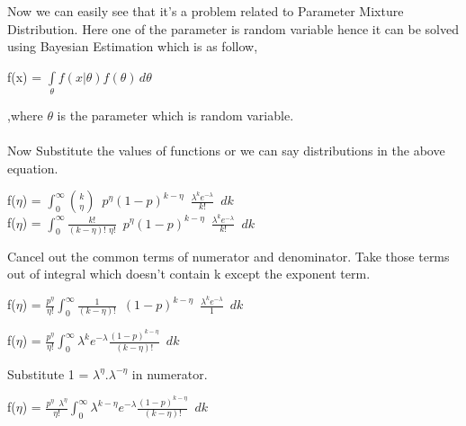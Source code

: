 \documentclass[12pt]{article}
\begin{document}
        Now we can easily see that it's a problem related to Parameter Mixture Distribution. Here one of the parameter is random variable hence it can be solved using Bayesian Estimation which is as follow,
        
        \begin{center}
        \large f(x) = $\int\limits_\theta f(x |\theta)f(\theta)\,d\theta$ \normalsize
        \end{center}
        
        ,where $\theta$ is the parameter which is random variable.\\\\
        Now Substitute the values of functions or we can say distributions in the above equation.
        
        \begin{center}
        \Large
        f($\eta$) = $\int_0^\infty \binom{k}{\eta}\,\,\, p^{\eta} (1-p)^{k-\eta}\,\,\, \frac{\lambda^{k}e^{-\lambda}}{k!}\,\,\, dk $ \\
        
        f($\eta$) = $\int_0^\infty \frac{k!}{(k-\eta)! \,\,\eta!}\,\,\, p^{\eta} (1-p)^{k-\eta}\,\,\, \frac{\lambda^{k}e^{-\lambda}}{k!}\,\,\, dk $ \\
        \end{center}
        
        \normalsize Cancel out the common terms of numerator and denominator. Take those terms out of integral which doesn't contain k except the exponent term.\Large
        
        \begin{center}
        f($\eta$) = $\frac{p^\eta}{\eta!}\int_0^\infty \frac{1}{(k-\eta)!}\,\,\, (1-p)^{k-\eta}\,\,\, \frac{\lambda^{k}e^{-\lambda}}{1}\,\,\, dk $ 
        
        f($\eta$) = $\frac{p^\eta}{\eta!}\int_0^\infty \lambda^{k}e^{-\lambda} \frac{(1-p)^{k-\eta}}{(k-\eta)!} \,\,\, dk $ \\
        \end{center}
        
        \normalsize Substitute 1 = $\lambda^{\eta}.\lambda^{-\eta}$ in numerator.\Large
        
        \begin{center}
        f($\eta$) = $\frac{p^{\eta}\,\,\,\lambda^{\eta}}{\eta!}\int_0^\infty \lambda^{k-\eta}e^{-\lambda} \frac{(1-p)^{k-\eta}}{(k-\eta)!} \,\,\, dk$ 
        \end{center}
        
\end{document}

